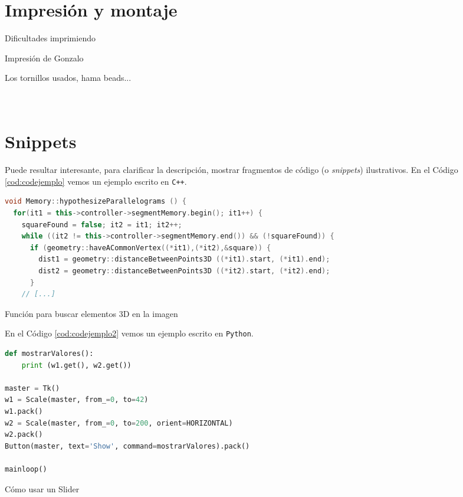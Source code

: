 \section{Impresión y montaje}


Dificultades imprimiendo 

Impresión de Gonzalo

Los tornillos usados, hama  beads...\\\\\\




\section{Snippets}

Puede resultar interesante, para clarificar la descripción, mostrar fragmentos de código (o \textit{snippets}) ilustrativos. En el Código \ref{cod:codejemplo} vemos un ejemplo escrito en \texttt{C++}.

\begin{code}[h]
\begin{lstlisting}[language=C++]
void Memory::hypothesizeParallelograms () {
  for(it1 = this->controller->segmentMemory.begin(); it1++) {
    squareFound = false; it2 = it1; it2++;
    while ((it2 != this->controller->segmentMemory.end()) && (!squareFound)) {
      if (geometry::haveACommonVertex((*it1),(*it2),&square)) {
        dist1 = geometry::distanceBetweenPoints3D ((*it1).start, (*it1).end);
        dist2 = geometry::distanceBetweenPoints3D ((*it2).start, (*it2).end);
      }
    // [...]
\end{lstlisting}
\caption[Función para buscar elementos 3D en la imagen]{Función para buscar elementos 3D en la imagen}
\label{cod:codejemplo}
\end{code}

En el Código \ref{cod:codejemplo2} vemos un ejemplo escrito en \texttt{Python}.

\begin{code}[h]
\begin{lstlisting}[language=Python]
def mostrarValores():
    print (w1.get(), w2.get())

master = Tk()
w1 = Scale(master, from_=0, to=42)
w1.pack()
w2 = Scale(master, from_=0, to=200, orient=HORIZONTAL)
w2.pack()
Button(master, text='Show', command=mostrarValores).pack()

mainloop()
\end{lstlisting}
\caption[Cómo usar un Slider]{Cómo usar un Slider}
\label{cod:codejemplo2}
\end{code}

